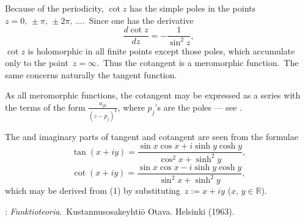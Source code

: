 \documentclass[12pt]{article}
\theoremstyle{definition}
\begin{document}
Because of the periodicity, $\cot{z}$ has the simple poles in the points 
$z = 0,\,\pm\pi,\,\pm 2\pi,\,\ldots$.\, Since one has the derivative
        $$\frac{d\cot{z}}{dz} = -\frac{1}{\sin^2{z}},$$
$\cot{z}$ is holomorphic in all finite points except those poles, which accumulate only to the point\, $z = \infty$.\, Thus the cotangent is a meromorphic function.\, The same concerns naturally the tangent function.

As all meromorphic functions, the cotangent may be expressed as a series with  the  terms of the form $\frac{a_{jk}}{(z-p_j)^k}$, where $p_j$'s are the poles --- see .

The  and imaginary parts of tangent and cotangent are seen from the formulae
$$\tan(x+iy) = \frac{\sin{x}\cos{x}+i\sinh{y}\cosh{y}}{\cos^2{x}+\sinh^2{y}},$$
$$\cot(x+iy) = \frac{\sin{x}\cos{x}-i\sinh{y}\cosh{y}}{\sin^2{x}+\sinh^2{y}},$$
which may be derived from (1) by substituting\, $z := x\!+\!iy$ 
($x,\,y \in\mathbb{R}$).

\begin{thebibliography}{9}
: {\em Funktioteoria}.\, Kustannusosakeyhti\"o Otava. Helsinki (1963).
\end{thebibliography}
\end{document}
